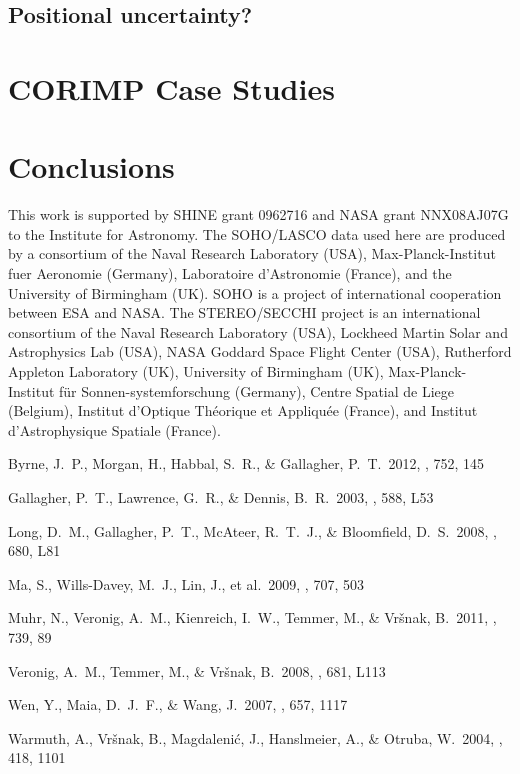 \documentclass[structabstract]{aa}
\begin{document}
\subsection{Positional uncertainty?}

\section{CORIMP Case Studies}

\section{Conclusions}
\label{sect_conclusions}


\begin{acknowledgements}
This work is supported by SHINE grant 0962716 and NASA grant NNX08AJ07G to the Institute for Astronomy. The SOHO/LASCO data used here are produced by a consortium of the Naval Research Laboratory (USA), Max-Planck-Institut fuer Aeronomie (Germany), Laboratoire d'Astronomie (France), and the University of Birmingham (UK). SOHO is a project of international cooperation between ESA and NASA. The STEREO/SECCHI project is an international consortium of the Naval Research Laboratory (USA), Lockheed Martin Solar and Astrophysics Lab (USA), NASA Goddard Space Flight Center (USA), Rutherford Appleton Laboratory (UK), University of Birmingham (UK), Max-Planck-Institut f\"{u}r Sonnen-systemforschung (Germany), Centre Spatial de Liege (Belgium), Institut d'Optique Th\'{e}orique et Appliqu\'{e}e (France), and Institut d'Astrophysique Spatiale (France). 
\end{acknowledgements}


\begin{thebibliography}{}

Byrne, J.~P., Morgan, H., Habbal, S.~R., \& Gallagher, P.~T.\ 2012, \apj, 752, 145 

Gallagher, P.~T., Lawrence, G.~R., \& Dennis, B.~R.\ 2003, \apjl, 588, L53 

Long, D.~M., Gallagher, P.~T., McAteer, R.~T.~J., \& Bloomfield, D.~S.\ 2008, \apjl, 680, L81 

Ma, S., Wills-Davey, M.~J., Lin, J., et al.\ 2009, \apj, 707, 503 

Muhr, N., Veronig, A.~M., Kienreich, I.~W., Temmer, M., \& Vr{\v s}nak, B.\ 2011, \apj, 739, 89 

Veronig, A.~M., Temmer, M., \& Vr{\v s}nak, B.\ 2008, \apjl, 681, L113 

Wen, Y., Maia, D.~J.~F., \& Wang, J.\ 2007, \apj, 657, 1117 

Warmuth, A., Vr{\v s}nak, B., Magdaleni{\'c}, J., Hanslmeier, A., \& Otruba, W.\ 2004, \aap, 418, 1101 


\end{thebibliography}

%
%  
\end{document}
